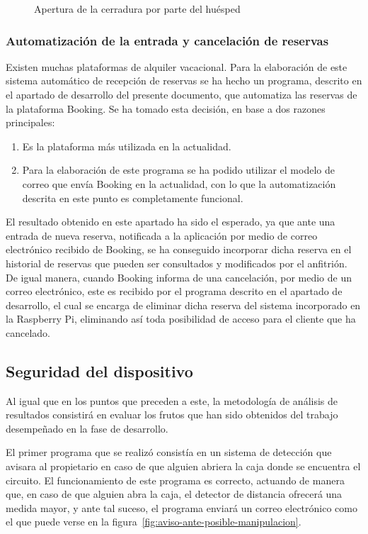 \begin{figure}[tbp]
\caption{Apertura de la cerradura por parte del huésped}
\label{fig:apertura-de-puerta-por-parte-del-huesped}
\end{figure}

\subsubsection{Automatización de la entrada y cancelación de reservas}

Existen muchas plataformas de alquiler vacacional. Para la elaboración de este sistema automático de recepción de reservas se ha hecho un programa, descrito en el apartado de desarrollo del presente documento, que automatiza las reservas de la plataforma Booking. Se ha tomado esta decisión, en base a dos razones principales:
\begin{enumerate}
\item Es la plataforma más utilizada en la actualidad.
\item Para la elaboración de este programa se ha podido utilizar el modelo de correo que envía Booking en la actualidad, con lo que la automatización descrita en este punto es completamente funcional.
\end{enumerate}

El resultado obtenido en este apartado ha sido el esperado, ya que ante una entrada de nueva reserva, notificada a la aplicación por medio de correo electrónico recibido de Booking, se ha conseguido incorporar dicha reserva en el historial de reservas que pueden ser consultados y modificados por el anfitrión. De igual manera, cuando Booking informa de una cancelación, por medio de un correo electrónico, este es recibido por el programa descrito en el apartado de desarrollo, el cual se encarga de eliminar dicha reserva del sistema incorporado en la Raspberry Pi, eliminando así toda posibilidad de acceso para el cliente que ha cancelado.

\subsection{Seguridad del dispositivo}
Al igual que en los puntos que preceden a este, la metodología de análisis de resultados consistirá en evaluar los frutos que han sido obtenidos del trabajo desempeñado en la fase de desarrollo.

El primer programa que se realizó consistía en un sistema de detección que avisara al propietario en caso de que alguien abriera la caja donde se encuentra el circuito.
El funcionamiento de este programa es correcto, actuando de manera que, en caso de que alguien abra la caja, el detector de distancia ofrecerá una medida mayor, y ante tal suceso, el programa enviará un correo electrónico como el que puede verse en la figura~\ref{fig:aviso-ante-posible-manipulacion}.

